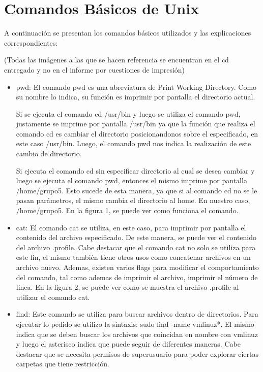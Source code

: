 \documentclass[a4paper, 12pt]{article}
\begin{document}
\tableofcontents
\newpage


\section*{Comandos B\'asicos de Unix}

A continuaci\'on se presentan los comandos b\'asicos utilizados y las explicaciones correspondientes:

(Todas las im\'agenes a las que se hacen referencia se encuentran en el cd entregado y no en el informe por cuestiones de impresi\'on)
\begin{itemize}
\item pwd: El comando pwd es una abreviatura de Print Working Directory. Como su nombre lo indica, su funci\'on es imprimir por pantalla el directorio actual.

Si se ejecuta el comando cd /usr/bin y luego se utiliza el comando pwd, justamente se imprime por pantalla /usr/bin ya que la funci\'on que realiza el comando cd es cambiar el directorio posicionandonos sobre el especificado, en este caso /usr/bin. Luego, el comando pwd nos indica la realizaci\'on de este cambio de directorio.

Si ejecuta el comando cd sin especificar directorio al cual se desea cambiar y luego se ejecuta el comando pwd, entonces el mismo imprime por pantalla /home/grupo5. Esto sucede de esta manera, ya que si al comando cd no se le pasan par\'ametros, el mismo cambia el directorio al home. En nuestro caso, /home/grupo5. En la figura 1, se puede ver como funciona el comando.

\item cat: El comando cat se utiliza, en este caso, para imprimir por pantalla el contenido del archivo especificado. De este manera, se puede ver el contenido del archivo .profile. Cabe destacar que el comando cat no solo se utiliza para este fin, el mismo tambi\'en tiene otros usos como concatenar archivos en un archivo nuevo. Ademas, existen varios flags para modificar el comportamiento del comando, tal como ademas de imprimir el archivo, imprimir el n\'umero de linea. En la figura 2, se puede ver como se muestra el archivo .profile al utilizar el comando cat.

\item find: Este comando se utiliza para buscar archivos dentro de directorios. Para ejecutar lo pedido se utilizo la sintaxis: sudo find -name vmlinuz*. El mismo indica que se deben buscar los archivos que coincidan en nombre con vmlinuz y luego el asterisco indica que puede seguir de diferentes maneras. Cabe destacar que se necesita permisos de superusuario para poder explorar ciertas carpetas que tiene restricci\'on.


\end{itemize}
\end{document}
